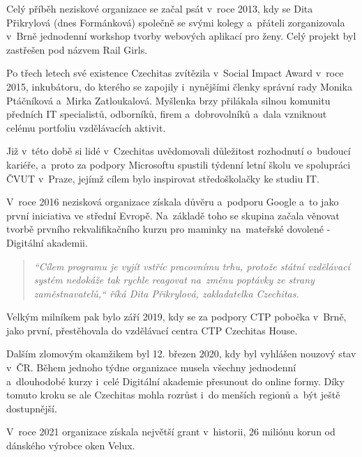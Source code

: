 \documentclass[12pt]{report}			%
\begin{document}
                Celý příběh neziskové organizace se začal psát v~roce 2013, kdy se Dita Přikrylová (dnes Formánková) společně se svými kolegy a~přáteli zorganizovala v~Brně jednodenní workshop tvorby webových aplikací pro ženy. Celý projekt byl zastřešen pod názvem Rail Girls.\cite{CzechitasRailGirls}

                Po třech letech své existence Czechitas zvítězila v~Social Impact Award v~roce 2015, inkubátoru, do kterého se zapojily i~nynějšími členky správní rady Monika Ptáčníková a~Mirka Zatloukalová. Myšlenka brzy přilákala silnou komunitu předních IT specialistů, odborníků, firem a~dobrovolníků a~dala vzniknout celému portfoliu vzdělávacích aktivit.\cite{CzechitasSocialImpactAward}

                Již v~této době si lidé v~Czechitas uvědomovali důležitost rozhodnutí o~budoucí kariéře, a~proto za podpory Microsoftu spustili týdenní letní školu ve spolupráci ČVUT v~Praze, jejímž cílem bylo inspirovat středoškolačky ke studiu IT.\cite{CzechitasLetniSkola}
    
                V~roce 2016 nezisková organizace získala důvěru a~podporu Google a~to jako první iniciativa ve střední Evropě. Na~základě toho se skupina začala věnovat tvorbě prvního rekvalifikačního kurzu pro maminky na~mateřské dovolené - Digitální akademii. \cite{CzechitasGoogleGrant}

                \begin{quote}
                    \textit{``Cílem programu je vyjít vstříc pracovnímu trhu, protože státní vzdělávací systém nedokáže tak rychle reagovat na~změnu poptávky ze strany zaměstnavatelů,`` říká Dita Přikrylová, zakladatelka Czechitas.}\cite{CzechitasGoogleGrant}
                \end{quote}

                Velkým milníkem pak bylo září 2019, kdy se za podpory CTP pobočka v~Brně, jako první, přestěhovala do vzdělávací centra CTP Czechitas House.\cite{CzechitasHome}
                
                Dalším zlomovým okamžikem byl 12. březen 2020, kdy byl vyhlášen nouzový stav v~ČR.\cite{NouzovyStav} Během jednoho týdne organizace musela všechny jednodenní a~dlouhodobé kurzy i~celé Digitální akademie přesunout do online formy. Díky tomuto kroku se ale Czechitas mohla rozrůst i~do menších regionů a~být ještě dostupnější.\cite{Czechitas2020}

                V~roce 2021 organizace získala největší grant v~historii, 26 miliónu korun od dánského výrobce oken Velux.\cite{ForbesGrant}
\end{document}
